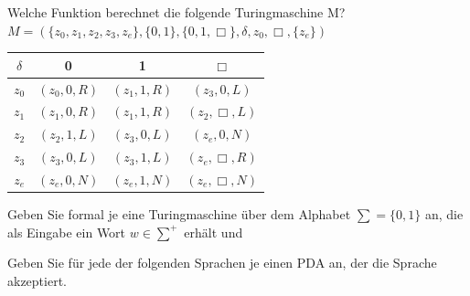 \documentclass[10pt, a4paper]{exam}
\begin{document}
\begin{questions}
    \question Welche Funktion berechnet die folgende Turingmaschine M? $M = (\{z_0, z_1, z_2, z_3, z_e\}, \{0, 1\}, \{0, 1,\Box\}, \delta, z_0 , \Box, \{z_e\})$
    \begin{tabular}{c|ccc}
        $\delta$ & 0              & 1              & $\Box$            \\\hline
        $z_0$    & $(z_0 , 0, R)$ & $(z_1 , 1, R)$ & $(z_3 , 0, L)$    \\
        $z_1$    & $(z_1 , 0, R)$ & $(z_1 , 1, R)$ & $(z_2 , \Box, L)$ \\
        $z_2$    & $(z_2 , 1, L)$ & $(z_3 , 0, L)$ & $(z_e , 0, N)$    \\
        $z_3$    & $(z_3 , 0, L)$ & $(z_3 , 1, L)$ & $(z_e , \Box, R)$ \\
        $z_e$    & $(z_e , 0, N)$ & $(z_e , 1, N)$ & $(z_e ,\Box, N)$
    \end{tabular}
    \begin{solution}
    \end{solution}

    \question Geben Sie formal je eine Turingmaschine über dem Alphabet $\sum = \{0, 1\}$ an, die als Eingabe ein Wort $w\in\sum^+$ erhält und

    \question Geben Sie für jede der folgenden Sprachen je einen PDA an, der die Sprache akzeptiert.
\end{questions}
\end{document}
